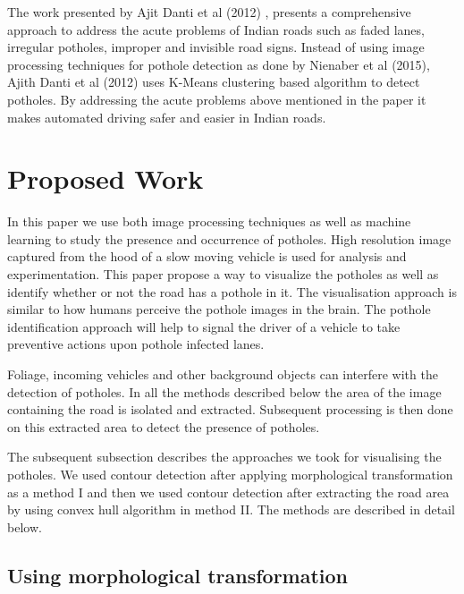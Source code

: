 \documentclass[journal]{IEEEtran}
\begin{document}
\vspace*{.5cm}

The work presented by Ajit Danti et al (2012) \cite{papertwo}, presents a comprehensive approach to address the acute problems of Indian roads such as faded lanes, irregular potholes, improper and invisible road signs. Instead of using image processing techniques for pothole detection as done by Nienaber et al (2015), Ajith Danti et al (2012) uses K-Means clustering based algorithm to detect potholes. By addressing the acute problems above mentioned in the paper it makes automated driving safer and easier in Indian roads. 

\section{Proposed Work}
In this paper we use both image processing techniques as well as machine learning to study the presence and occurrence of potholes. High resolution image captured from the hood of a slow moving vehicle is used for analysis and experimentation. This paper propose a way to visualize the potholes as well as identify whether or not the road has a pothole in it. The visualisation approach is similar to how humans perceive the pothole images in the brain. The pothole identification approach will help to signal the driver of a vehicle to take preventive actions upon pothole infected lanes. 

\vspace{0.5cm}

Foliage, incoming vehicles and other background objects can interfere with the detection of potholes. In all the methods described below the area of the image containing the road is isolated and extracted. Subsequent processing is then done on this extracted area to detect the presence of potholes. 

\vspace{0.5cm}

The subsequent subsection describes the approaches we took for visualising the potholes. We used contour detection after applying morphological transformation as a method I and then we used contour detection after extracting the road area by using convex hull algorithm in method II. The methods are described in detail below.

\subsection{Using morphological transformation}
\end{document}
